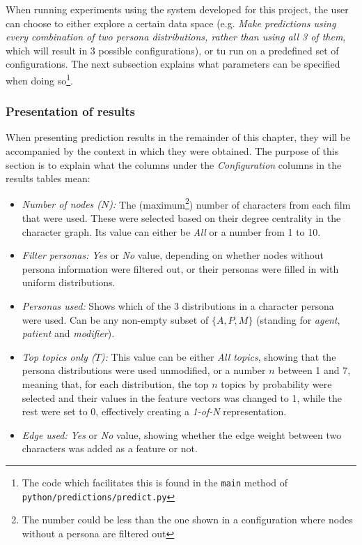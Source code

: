 \documentclass[bsc,frontabs,singlespacing,parskip, twoside]{infthesis}
\begin{document}
When running experiments using the system developed for this project, the user can choose to either explore a certain data space (e.g. \textit{Make predictions using every combination of two persona distributions, rather than using all 3 of them}, which will result in 3 possible configurations), or tu run on a predefined set of configurations. The next subsection explains what parameters can be specified when doing so\footnote{The code which facilitates this is found in the \texttt{main} method of \texttt{python/predictions/predict.py}}. 

\subsubsection{Presentation of results}
When presenting prediction results in the remainder of this chapter, they will be accompanied by the context in which they were obtained. The purpose of this section is to explain what the columns under the \textit{Configuration} columns in the results tables mean:
\begin{itemize}
	\item \textit{Number of nodes ($N$):} The (maximum\footnote{The number could be less than the one shown in a configuration where nodes without a persona are filtered out}) number of characters from each film that were used. These were selected based on their degree centrality in the character graph. Its value can either be \textit{All} or a number from 1 to 10.
	\item \textit{Filter personas:} \textit{Yes} or \textit{No} value, depending on whether nodes without persona information were filtered out, or their personas were filled in with uniform distributions.
	\item \textit{Personas used:} Shows which of the 3 distributions in a character persona were used. Can be any non-empty subset of $\{A, P, M\}$ (standing for \textit{agent}, \textit{patient} and \textit{modifier}).
	\item \textit{Top topics only ($T$):} This value can be either \textit{All topics}, showing that the persona distributions were used unmodified, or a number $n$ between 1 and 7, meaning that, for each distribution, the top $n$ topics by probability were selected and their values in the feature vectors was changed to 1, while the rest were set to 0, effectively creating a \textit{1-of-N} representation.
	\item \textit{Edge used:} \textit{Yes} or \textit{No} value, showing whether the edge weight between two characters was added as a feature or not.
\end{itemize}
\end{document}
